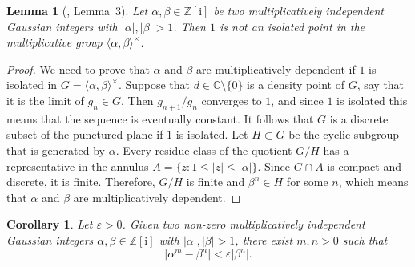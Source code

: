\documentclass{amsart}
\newcommand{\Z}{\mathbb{Z}}
\newcommand{\ii}{\mathrm{i}}
\newtheorem*{main theorem}{Theorem \ref{thm:main-gaussian}}
\newtheorem{corollary}[theorem]{Corollary}
\newtheorem{lemma}[theorem]{Lemma}
\theoremstyle{definition}
\begin{document}
\begin{lemma}[\hspace{1sp}\cite{Bosma-Fokkink-Krebs}, Lemma~3] Let $\alpha,\beta\in\Z[\ii]$ be two multiplicatively independent Gaussian integers with $\lvert\alpha\rvert,\lvert\beta\rvert>1$. Then $1$ is not an isolated point in the multiplicative group $\langle\alpha,\beta\rangle^\times$.
\end{lemma}
\begin{proof}
     We need to prove that $\alpha$ and
    $\beta$ are multiplicatively dependent if $1$ is isolated in $G=\langle\alpha,\beta\rangle^\times$. 
    Suppose that $d\in \mathbb C\setminus\{0\}$ is a density point of $G$, say that it is the limit of $g_n\in G$. 
    Then $g_{n+1}/g_{n}$ converges to $1$, and since $1$ is isolated this means that the sequence
    is eventually constant. It follows that $G$ is a discrete subset of the punctured plane if $1$ is isolated.
    Let $H\subset G$ be the cyclic subgroup that is generated by $\alpha$. Every residue class of the quotient $G/H$ 
    has a representative in the annulus $A=\{z : 1 \leq |z| \leq |\alpha|\}$. Since $G\cap A$ is compact and discrete,
    it is finite. Therefore, $G/H$ is finite and $\beta^n\in H$ for some $n$, which means that $\alpha$ and $\beta$
    are multiplicatively dependent.
\end{proof}


\begin{corollary}\label{cor:dirichlet}
    Let $\varepsilon>0$. Given two non-zero multiplicatively independent Gaussian integers $\alpha,\beta\in\Z[\ii]$ with $\lvert\alpha\rvert,\lvert\beta\rvert>1$, there exist $m,n>0$ such that
    \begin{equation}\label{eq:relatively-close-powers}
        \lvert \alpha^m-\beta^n\rvert<\varepsilon\lvert \beta^n\rvert.
    \end{equation}
\end{corollary}
\end{document}
